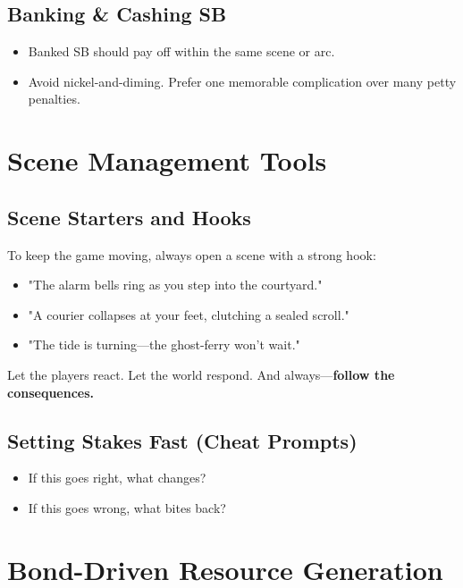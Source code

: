 \subsection{Banking \& Cashing SB}

\begin{itemize}
    \item Banked SB should pay off within the same scene or arc.
    \item Avoid nickel-and-diming. Prefer one memorable complication over many petty penalties.
\end{itemize}

\section{Scene Management Tools}

\subsection{Scene Starters and Hooks}

To keep the game moving, always open a scene with a strong hook:

\begin{itemize}
    \item "The alarm bells ring as you step into the courtyard."
    \item "A courier collapses at your feet, clutching a sealed scroll."
    \item "The tide is turning---the ghost-ferry won't wait."
\end{itemize}

Let the players react. Let the world respond. And always---\textbf{follow the consequences.}

\subsection{Setting Stakes Fast (Cheat Prompts)}

\begin{itemize}
    \item If this goes right, what changes?
    \item If this goes wrong, what bites back?
\end{itemize}

\section{Bond-Driven Resource Generation}

